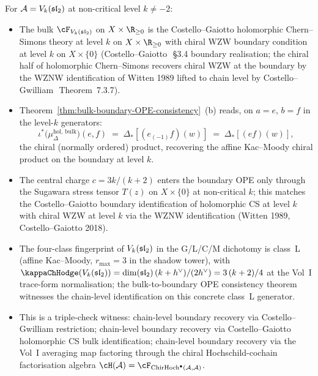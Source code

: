 \begin{remark}[Concrete witness on $\cA = V_k(\fsl_2)$]
\label{rem:bulk-bdry-witness-vk-sl2}%
For $\cA = V_k(\fsl_2)$ at non-critical level $k \neq -2$:
\begin{itemize}
\item The bulk $\cF_{V_k(\fsl_2)}$ on $X \times \R_{\geq 0}$ is
the Costello--Gaiotto holomorphic Chern--Simons theory at level
$k$ on $X \times \R_{\geq 0}$ with chiral WZW boundary
condition at level $k$ on $X \times \{0\}$
(Costello--Gaiotto~\cite{CostelloGaiotto18}\,\S3.4 boundary
realisation; the chiral half of holomorphic Chern--Simons recovers
chiral WZW at the boundary by the WZNW identification of
Witten 1989 lifted to chain level by
Costello--Gwilliam~\cite{CG21}\,Theorem~7.3.7).
\item Theorem~\ref{thm:bulk-boundary-OPE-consistency}~(b) reads,
on $a = e$, $b = f$ in the level-$k$ generators:
\[
 \iota^*\bigl(\mu^{\mathrm{hol},\,\mathrm{bulk}}_\Delta\bigr)
 (e, f)
 \;=\;
 \Delta_*[(e_{(-1)}f)(w)]
 \;=\;
 \Delta_*[(ef)(w)],
\]
the chiral (normally ordered) product, recovering the affine
Kac--Moody chiral product on the boundary at level $k$.
\item The central charge $c = 3k/(k+2)$ enters the boundary OPE
only through the Sugawara stress tensor $T(z)$ on $X \times \{0\}$
at non-critical $k$; this matches the Costello--Gaiotto
boundary identification of holomorphic CS at level $k$ with chiral
WZW at level $k$ via the WZNW identification
(Witten 1989, Costello--Gaiotto 2018).
\item The four-class fingerprint of $V_k(\mathfrak{sl}_2)$ in the
G/L/C/M dichotomy is class~L
(affine Kac--Moody, $r_{\max} = 3$ in the shadow tower), with
$\kappaChHodge(V_k(\fsl_2)) = \dim(\fsl_2)\,(k+h^\vee)/(2h^\vee) =
3\,(k+2)/4$ at the Vol~I trace-form normalisation; the
bulk-to-boundary OPE consistency theorem witnesses the
chain-level identification on this concrete class~L generator.
\item This is a triple-check witness: chain-level boundary
recovery via Costello--Gwilliam restriction; chain-level boundary
recovery via Costello--Gaiotto holomorphic CS bulk identification;
chain-level boundary recovery via the Vol~I averaging map
factoring through the chiral Hochschild-cochain factorisation algebra
$\cH(\cA) = \cF_{\ChirHoch^\bullet(\cA,\cA)}$.
\end{itemize}
\end{remark}

